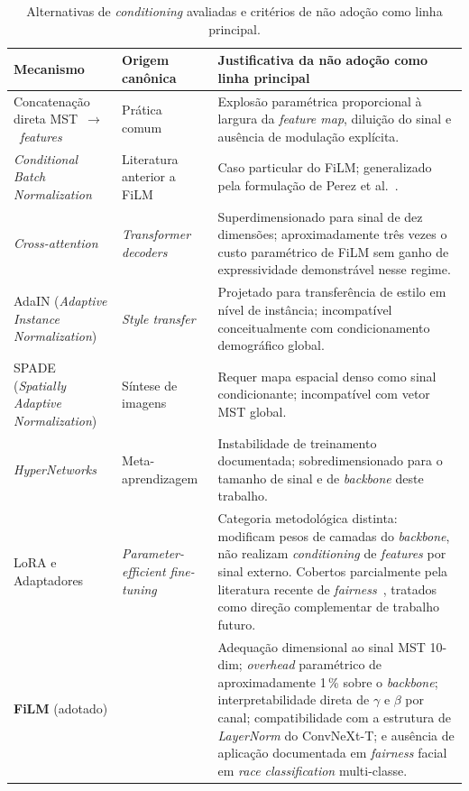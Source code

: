 \begin{table}[htbp]
\centering
\small
\begin{tabular}{p{3.5cm}p{3.5cm}p{7.5cm}}
\toprule
\textbf{Mecanismo} & \textbf{Origem canônica} & \textbf{Justificativa da não adoção como linha principal} \\
\midrule
Concatenação direta MST~$\rightarrow$~\emph{features} & Prática comum & Explosão paramétrica proporcional à largura da \emph{feature map}, diluição do sinal e ausência de modulação explícita. \\
\emph{Conditional Batch Normalization} & Literatura anterior a FiLM & Caso particular do FiLM; generalizado pela formulação de Perez et al.~\autocite{perez2018film}. \\
\emph{Cross-attention} & \emph{Transformer decoders} & Superdimensionado para sinal de dez dimensões; aproximadamente três vezes o custo paramétrico de FiLM sem ganho de expressividade demonstrável nesse regime. \\
AdaIN (\emph{Adaptive Instance Normalization}) & \emph{Style transfer} & Projetado para transferência de estilo em nível de instância; incompatível conceitualmente com condicionamento demográfico global. \\
SPADE (\emph{Spatially Adaptive Normalization}) & Síntese de imagens & Requer mapa espacial denso como sinal condicionante; incompatível com vetor MST global. \\
\emph{HyperNetworks} & Meta-aprendizagem & Instabilidade de treinamento documentada; sobredimensionado para o tamanho de sinal e de \emph{backbone} deste trabalho. \\
LoRA e Adaptadores & \emph{Parameter-efficient fine-tuning} & Categoria metodológica distinta: modificam pesos de camadas do \emph{backbone}, não realizam \emph{conditioning} de \emph{features} por sinal externo. Cobertos parcialmente pela literatura recente de \emph{fairness}~\autocite{sukumaran2024fairlora,bian2025lora}, tratados como direção complementar de trabalho futuro. \\
\midrule
\textbf{FiLM} (adotado) & \textcite{perez2018film} & Adequação dimensional ao sinal MST 10-dim; \emph{overhead} paramétrico de aproximadamente 1\,\% sobre o \emph{backbone}; interpretabilidade direta de $\gamma$ e $\beta$ por canal; compatibilidade com a estrutura de \emph{LayerNorm} do ConvNeXt-T; e ausência de aplicação documentada em \emph{fairness} facial em \emph{race classification} multi-classe. \\
\bottomrule
\end{tabular}
\caption{Alternativas de \emph{conditioning} avaliadas e critérios de não adoção como linha principal.}
\label{tab:cond_alternativas}
\end{table}

